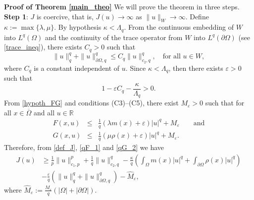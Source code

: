 \documentclass[pdflatex,sn-mathphys-num]{sn-jnl}
\theoremstyle{thmstyleone}%
\theoremstyle{thmstyletwo}%
\theoremstyle{thmstylethree}%
\theoremstyle{thmstylethree}%
\begin{document}
\vskip0.4cm 
\noindent
{\bf Proof of Theorem  \ref{main_theo}}\mbox{}
\vskip0.3cm
\noindent
We will prove the theorem in three steps.\\
\vskip0.3cm
\noindent
\textbf{Step 1}:  $J$ is coercive, that is, $J(u)\to \infty$ as $\|u\|_{W}\to \infty$. Define $\kappa:=\max\{\lambda, \mu\}$.   By hypothesis $\kappa<\Lambda_q$. From the continuous embedding of $W$ into $L^q(\Omega)$ and the continuity of the trace operator from $W$ into $L^q(\partial \Omega)$ (see \eqref{trace_ineq}), there exists $C_q>0$ such that 
\begin{equation}\label{embedd1}
\|u\|_q^q+\|u\|_{\partial\Omega, q}^q \leqslant C_q \|u\|_{c_2, q}^q, \quad \text{for all } u\in W,\end{equation}
where $C_q$ is a constant independent of $u$. Since  $\kappa<\Lambda_q$,
then there exists $\varepsilon >0$ such that 
\begin{equation}\label{eps_kap_lam}
    1-\varepsilon C_q -\frac{\kappa}{\Lambda_q}>0.
\end{equation}
From \eqref{hypoth_FG}  and conditions (C3)--(C5), there exist 
      $M_{\varepsilon}>0$ such that for all  $x\in \overline{\Omega}$ and all $u\in \mathbb{R}$ 
    \begin{eqnarray}\label{qF_1}
        F(x,u) &\leqslant &\frac{1}{q}(\lambda m(x) + \varepsilon)|u|^q +M_\varepsilon \qquad \text{and} \\
        G(x,u) &\leqslant & \frac{1}{q}(\mu \rho (x) + \varepsilon)|u|^q +M_{\varepsilon} .\label{qG_2}
    \end{eqnarray}
Therefore,
    from \eqref{def_J}, \eqref{qF_1} and \eqref{qG_2} we have   \begin{equation}\label{J_coerciv_1a}
      \begin{aligned}
        J(u) &\geqslant  
        \frac{1}{p}\|u\|_{c_1,p}^p+\frac{1}{q}\|u\|_{c_2,q}^q- \frac{\kappa}q \left(\int_\Omega  m(x) |u|^q   +\int_{\partial \Omega} \rho(x) |u|^q\right) \\
        &  -\frac{\varepsilon}{q}(\|u\|_q^q+\|u\|_{\partial\Omega ,q}^q)- \hat{M}_\varepsilon, 
              \end{aligned}
    \end{equation}
where $\hat{M}_\varepsilon:=\frac{M_\varepsilon}{q}(|\Omega|+|\partial\Omega|)$.
\end{document}
